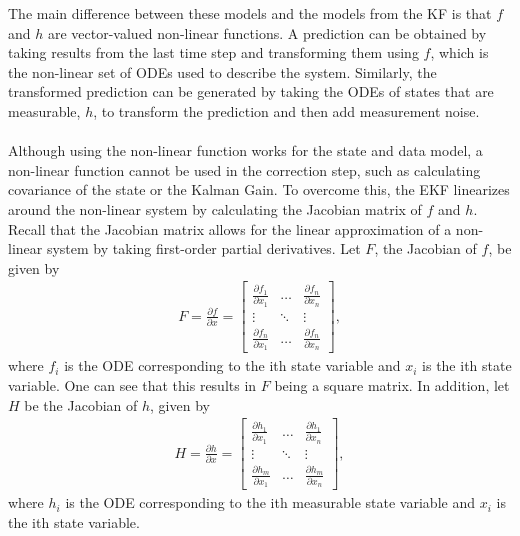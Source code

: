 \noindent The main difference between these models and the models from the KF is that $f$ and $h$ are vector-valued non-linear functions. A prediction can be obtained by taking results from the last time step and transforming them using $f$, which is the non-linear set of ODEs used to describe the system. Similarly, the transformed prediction can be generated by taking the ODEs of states that are measurable, $h$,  to transform the prediction and then add measurement noise. \\ \\
\noindent Although using the non-linear function works for the state and data model, a non-linear function cannot be used in the correction step, such as calculating covariance of the state or the Kalman Gain. To overcome this, the EKF linearizes around the non-linear system by calculating the Jacobian matrix of $f$ and $h$. Recall that the Jacobian matrix allows for the linear approximation of a non-linear system by taking first-order partial derivatives. Let $F$, the Jacobian of $f$, be given by \begin{align*}
      F= \frac{\partial f}{\partial x} =
      \begin{bmatrix}
           \frac{\partial f_1}{\partial x_1} & \hdots & \frac{\partial f_n}{\partial x_n} \\
           \vdots & \ddots & \vdots \\
           \frac{\partial f_n}{\partial x_1}  & \hdots & \frac{\partial f_n}{\partial x_n}
         \end{bmatrix} ,
  \end{align*}
  where $f_i $ is the ODE corresponding to the ith state variable and $x_i$ is the ith state variable. One can see that this results in $F$ being a square matrix. In addition, let $H$ be the Jacobian of $h$, given by
  \begin{align*}
      H = \frac{\partial h}{\partial x} =
     \begin{bmatrix}
           \frac{\partial h_1}{\partial x_1} & \hdots & \frac{\partial h_1}{\partial x_n} \\
           \vdots & \ddots & \vdots \\
           \frac{\partial h_m}{\partial x_1}  & \hdots & \frac{\partial h_{m}}{\partial x_n}
         \end{bmatrix} ,
  \end{align*} 
  where $h_i $ is the ODE corresponding to the ith measurable state variable and $x_i$ is the ith state variable. \\ \\
